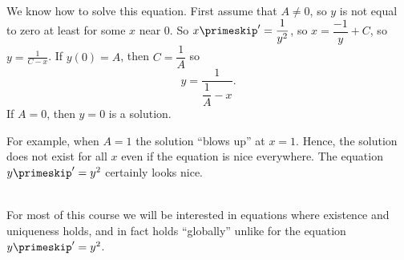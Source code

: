{
We know how to solve this equation.  First assume that $A \not= 0$,
so $y$ is not equal to zero at least for some $x$ near 0.  So
$x\primeskip' = \dfrac{1}{y^2}$, so
$x = \dfrac{-1}{y} + C$, so $y = \frac{1}{C-x}$.  If $y(0) = A$, then
$C = \dfrac{1}{A}$ so
\begin{equation*}
y = \frac{1}{\dfrac{1}{A} - x} .
\end{equation*}
If $A=0$, then $y=0$ is a solution.

For example, when $A=1$
the solution ``blows up'' at $x=1$.  Hence, the solution does not exist
for all $x$ even if the equation is nice everywhere.  The equation
$y\primeskip ' = y^2$ certainly
looks nice.
}\\

For most of this
course we will be interested in equations where existence and
uniqueness holds, and in fact holds ``globally'' unlike for the equation
$y\primeskip '=y^2$.

